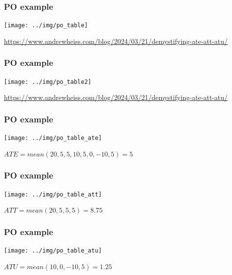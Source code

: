 \documentclass[aspectratio=43]{beamer}
\begin{document}
\begin{frame}
\frametitle{PO example}
\centering

\texttt{[image: ../img/po\_table]}

\href{https://www.andrewheiss.com/blog/2024/03/21/demystifying-ate-att-atu/}{\footnotesize https://www.andrewheiss.com/blog/2024/03/21/demystifying-ate-att-atu/}
  

\end{frame}

\begin{frame}
\frametitle{PO example}
\centering

\texttt{[image: ../img/po\_table2]}

\href{https://www.andrewheiss.com/blog/2024/03/21/demystifying-ate-att-atu/}{\footnotesize https://www.andrewheiss.com/blog/2024/03/21/demystifying-ate-att-atu/}
  

\end{frame}

\begin{frame}
\frametitle{PO example}
\centering

\texttt{[image: ../img/po\_table\_ate]}

$ATE = mean(20, 5, 5, 10, 5, 0, -10, 5) = 5$
  
\end{frame}

\begin{frame}
\frametitle{PO example}
\centering

\texttt{[image: ../img/po\_table\_att]}

$ATT = mean(20, 5, 5, 5) = 8.75$
  
\end{frame}

\begin{frame}
\frametitle{PO example}
\centering

\texttt{[image: ../img/po\_table\_atu]}

$ATU = mean(10, 0, -10, 5) = 1.25$
  
\end{frame}
\end{document}
